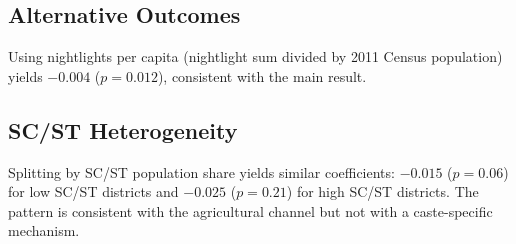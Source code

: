 \documentclass[12pt]{article}
\begin{document}
\subsection{Alternative Outcomes}

Using nightlights per capita (nightlight sum divided by 2011 Census population) yields $-0.004$ ($p = 0.012$), consistent with the main result.

\subsection{SC/ST Heterogeneity}

Splitting by SC/ST population share yields similar coefficients: $-0.015$ ($p = 0.06$) for low SC/ST districts and $-0.025$ ($p = 0.21$) for high SC/ST districts. The pattern is consistent with the agricultural channel but not with a caste-specific mechanism.
\end{document}
